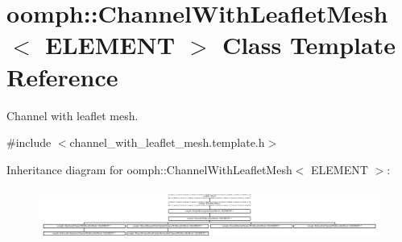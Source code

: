 \hypertarget{classoomph_1_1ChannelWithLeafletMesh}{}\section{oomph\+:\+:Channel\+With\+Leaflet\+Mesh$<$ E\+L\+E\+M\+E\+NT $>$ Class Template Reference}
\label{classoomph_1_1ChannelWithLeafletMesh}


Channel with leaflet mesh.  




{\ttfamily \#include $<$channel\+\_\+with\+\_\+leaflet\+\_\+mesh.\+template.\+h$>$}

Inheritance diagram for oomph\+:\+:Channel\+With\+Leaflet\+Mesh$<$ E\+L\+E\+M\+E\+NT $>$\+:\begin{figure}[H]
\begin{center}
\leavevmode
\includegraphics[height=1.696970cm]{classoomph_1_1ChannelWithLeafletMesh}
\end{center}
\end{figure}
